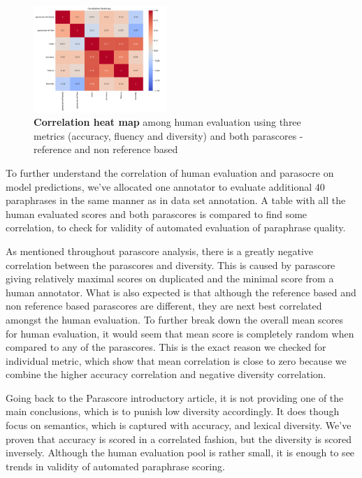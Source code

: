 \documentclass[fleqn,moreauthors,10pt]{ds_report}
\begin{document}
\begin{figure}[ht]
    \centering
    \includegraphics[width=0.45\textwidth]{report/fig/corr_heatmap.pdf}
    \caption{\textbf{Correlation heat map} among human evaluation using three metrics (accuracy, fluency and diversity) and both parascores - reference and non reference based}
    \label{fig:corr-heatmap}
\end{figure}

To further understand the correlation of human evaluation and parasocre on model predictions, we've allocated one annotator to evaluate additional 40 paraphrases in the same manner as in data set annotation. A table with all the human evaluated scores and both parascores is compared to find some correlation, to check for validity of automated evaluation of paraphrase quality.

As mentioned throughout parascore analysis, there is a greatly negative correlation between the parascores and diversity. This is caused by parascore giving relatively maximal scores on duplicated and the minimal score from a human annotator. What is also expected is that although the reference based and non reference based parascores are different, they are next best correlated amongst the human evaluation. To further break down the overall mean scores for human evaluation, it would seem that mean score is completely random when compared to any of the parascores. This is the exact reason we checked for individual metric, which show that mean correlation is close to zero because we combine the higher accuracy correlation and negative diversity correlation.

Going back to the Parascore introductory article, it is not providing one of the main conclusions, which is to punish low diversity accordingly. It does though focus on semantics, which is captured with accuracy, and lexical diversity. We've proven that accuracy is scored in a correlated fashion, but the diversity is scored inversely. Although the human evaluation pool is rather small, it is enough to see trends in validity of automated paraphrase scoring.
\end{document}
